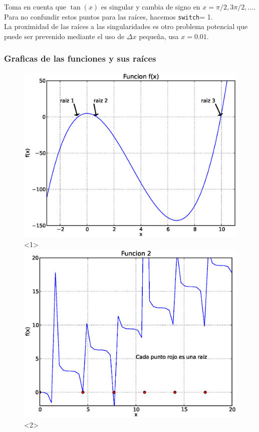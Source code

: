 \documentclass[12pt]{beamer}
\begin{document}
\begin{frame}
Toma en cuenta que $\tan(x)$ es singular y cambia de signo en $x = \pi/2, 3\pi/2,\ldots$. Para no confundir estos puntos para las ra\'{i}ces, hacemos \texttt{switch}= 1.
\\
\medskip
La proximidad de las ra\'{i}ces a las singularidades es otro problema potencial que puede ser prevenido mediante el uso de $\Delta x$ pequeña, usa $x = 0.01$.
\end{frame}
\begin{frame}
\frametitle{Graficas de las funciones y sus ra\'{i}ces}
\begin{figure}
	\centering
	\includegraphics[scale=0.4]{ejercicio1_Biseccion.eps}<1>
	\includegraphics[scale=0.4]{ejercicio2_Biseccion.eps}<2>
\end{figure}
\end{frame}
\end{document}
